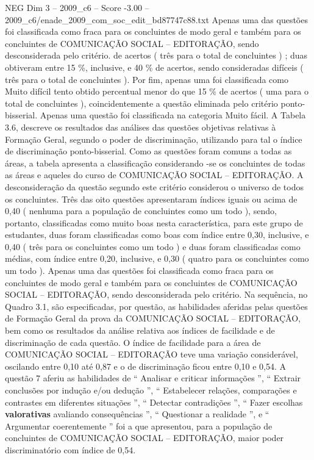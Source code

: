 \begin{textsample}{NEG Dim 3 – 2009\_c6 – Score -3.00 – 2009\_c6/enade\_2009\_com\_soc\_edit\_bd87747c88.txt}
Apenas uma das questões foi classificada como fraca para os concluintes de modo geral e também para os concluintes de COMUNICAÇÃO SOCIAL – EDITORAÇÃO, sendo desconsiderada pelo critério. de acertos ( três para o total de concluintes ) ; duas obtiveram entre 15 \%, inclusive, e 40 \% de acertos, sendo consideradas difíceis ( três para o total de concluintes ).
Por fim, apenas uma foi classificada como Muito difícil tento obtido percentual menor do que 15 \% de acertos ( uma para o total de concluintes ), coincidentemente a questão eliminada pelo critério ponto-bisserial.
Apenas uma questão foi classificada na categoria Muito fácil.
A Tabela 3.6, descreve os resultados das análises das questões objetivas relativas à Formação Geral, segundo o poder de discriminação, utilizando para tal o índice de discriminação ponto-bisserial.
Como as questões foram comuns a todas as áreas, a tabela apresenta a classificação considerando -se os concluintes de todas as áreas e aqueles do curso de COMUNICAÇÃO SOCIAL – EDITORAÇÃO.
A desconsideração da questão segundo este critério considerou o universo de todos os concluintes.
Três das oito questões apresentaram índices iguais ou acima de 0,40 ( nenhuma para a população de concluintes como um todo ), sendo, portanto, classificadas como muito boas nesta característica, para este grupo de estudantes, duas foram classificadas como boas com índice entre 0,30, inclusive, e 0,40 ( três para os concluintes como um todo ) e duas foram classificadas como médias, com índice entre 0,20, inclusive, e 0,30 ( quatro para os concluintes como um todo ).
Apenas uma das questões foi classificada como fraca para os concluintes de modo geral e também para os concluintes de COMUNICAÇÃO SOCIAL – EDITORAÇÃO, sendo desconsiderada pelo critério.
Na sequência, no Quadro 3.1, são especificadas, por questão, as habilidades aferidas pelas questões de Formação Geral da prova da COMUNICAÇÃO SOCIAL – EDITORAÇÃO, bem como os resultados da análise relativa aos índices de facilidade e de discriminação de cada questão.
O índice de facilidade para a área de COMUNICAÇÃO SOCIAL – EDITORAÇÃO teve uma variação considerável, oscilando entre 0,10 até 0,87 e o de discriminação ficou entre 0,10 e 0,54.
A questão 7 aferiu as habilidades de “ Analisar e criticar informações ”, “ Extrair conclusões por indução e/ou dedução ”, “ Estabelecer relações, comparações e contrastes em diferentes situações ”, “ Detectar contradições ”, “ Fazer escolhas \textbf{valorativas} avaliando consequências ”, “ Questionar a realidade ”, e “ Argumentar coerentemente ” foi a que apresentou, para a população de concluintes de COMUNICAÇÃO SOCIAL – EDITORAÇÃO, maior poder discriminatório com índice de 0,54.

\end{textsample}
